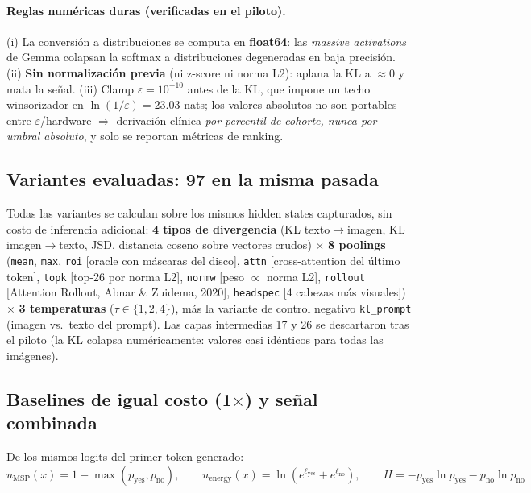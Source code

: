 \documentclass[12pt,a4paper]{article}
\begin{document}
\paragraph{Reglas numéricas duras (verificadas en el piloto).}
(i) La conversión a distribuciones se computa en \textbf{float64}:
las \emph{massive activations} de Gemma colapsan la softmax a
distribuciones degeneradas en baja precisión. (ii) \textbf{Sin
normalización previa} (ni z-score ni norma L2): aplana la KL a
$\approx 0$ y mata la señal. (iii) Clamp $\varepsilon = 10^{-10}$ antes de
la KL, que impone un techo winsorizador en $\ln(1/\varepsilon) = 23.03$
nats; los valores absolutos no son portables entre $\varepsilon$/hardware
$\Rightarrow$ derivación clínica \emph{por percentil de cohorte, nunca por
umbral absoluto}, y solo se reportan métricas de ranking.

\subsection{Variantes evaluadas: 97 en la misma pasada}
\label{sec:poolings}

Todas las variantes se calculan sobre los mismos hidden states capturados,
sin costo de inferencia adicional: \textbf{4 tipos de divergencia}
(KL texto$\to$imagen, KL imagen$\to$texto, JSD, distancia coseno sobre
vectores crudos) $\times$ \textbf{8 poolings} (\texttt{mean}, \texttt{max},
\texttt{roi} [oracle con máscaras del disco], \texttt{attn}
[cross-attention del último token], \texttt{topk} [top-26 por norma L2],
\texttt{normw} [peso $\propto$ norma L2], \texttt{rollout} [Attention
Rollout, Abnar \& Zuidema, 2020], \texttt{headspec} [4 cabezas más
visuales]) $\times$ \textbf{3 temperaturas} ($\tau \in \{1, 2, 4\}$), más la
variante de control negativo \texttt{kl\_prompt} (imagen vs.\ texto del
prompt). Las capas intermedias 17 y 26 se descartaron tras el piloto (la
KL colapsa numéricamente: valores casi idénticos para todas las imágenes).

\subsection{Baselines de igual costo (1$\times$) y señal combinada}
\label{sec:baselines}

De los mismos logits del primer token generado:
\begin{equation}
u_{\mathrm{MSP}}(x) = 1 - \max(p_{\mathrm{yes}}, p_{\mathrm{no}}),
\qquad
u_{\mathrm{energy}}(x) = \ln\!\left(e^{\ell_{\mathrm{yes}}} + e^{\ell_{\mathrm{no}}}\right),
\qquad
H = -p_{\mathrm{yes}}\ln p_{\mathrm{yes}} - p_{\mathrm{no}}\ln p_{\mathrm{no}}
\end{equation}
\end{document}
